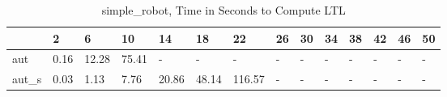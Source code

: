 \begin{table}
\caption{simple_robot, Time in Seconds to Compute LTL}
\label{simple_robot_LTL_time}
\begin{tabular}{llllllllllllll}
\toprule
 & 2 & 6 & 10 & 14 & 18 & 22 & 26 & 30 & 34 & 38 & 42 & 46 & 50 \\
\midrule
aut & 0.16 & 12.28 & 75.41 & - & - & - & - & - & - & - & - & - & - \\
aut_s & 0.03 & 1.13 & 7.76 & 20.86 & 48.14 & 116.57 & - & - & - & - & - & - & - \\
\bottomrule
\end{tabular}
\end{table}
